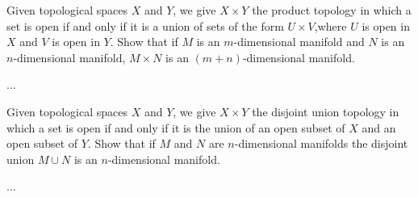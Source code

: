 \begin{p}
Given topological spaces $X$ and $Y$, we give $X\times Y$ the product topology in which a set is open if and only if it is a union of sets of the form $U\times V$,where $U$ is open in $X$ and $V$ is open in $Y$. Show that if $M$ is an $m$-dimensional manifold and $N$ is an $n$-dimensional manifold, $M \times  N$ is an $(m + n)$-dimensional manifold.
\end{p}
{...}
\begin{p}
Given topological spaces $X$ and $Y$, we give $X\times Y$ the disjoint union topology in which a set is open if and only if it is the union of an open subset of $X$ and an open subset of $Y$. Show that if $M$ and $N$ are $n$-dimensional manifolds the disjoint union $M \cup N$ is an $n$-dimensional manifold.
\end{p}
{...}


